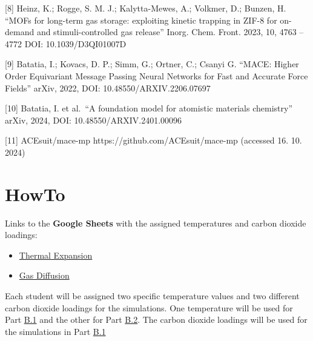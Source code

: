 \documentclass[
  letterpaper,
]{article}
\providecommand{\tightlist}{%
  \setlength{\itemsep}{0pt}\setlength{\parskip}{0pt}}\usepackage{longtable,booktabs,array}
\begin{document}
{[}8{]} Heinz, K.; Rogge, S. M. J.; Kalytta-Mewes, A.; Volkmer, D.;
Bunzen, H. ``MOFs for long-term gas storage: exploiting kinetic trapping
in ZIF-8 for on-demand and stimuli-controlled gas release'' Inorg. Chem.
Front. 2023, 10, 4763 -- 4772 DOI: 10.1039/D3QI01007D

{[}9{]} Batatia, I.; Kovacs, D. P.; Simm, G.; Ortner, C.; Csanyi G.
``MACE: Higher Order Equivariant Message Passing Neural Networks for
Fast and Accurate Force Fields'' arXiv, 2022, DOI:
10.48550/ARXIV.2206.07697

{[}10{]} Batatia, I. et al.~``A foundation model for atomistic materials
chemistry'' arXiv, 2024, DOI: 10.48550/ARXIV.2401.00096

{[}11{]} ACEsuit/mace-mp https://github.com/ACEsuit/mace-mp (accessed
16. 10. 2024)

\hypertarget{howto}{%
\section{HowTo}\label{howto}}

\begin{tcolorbox}[enhanced jigsaw, opacitybacktitle=0.6, colback=white, rightrule=.15mm, bottomrule=.15mm, coltitle=black, toprule=.15mm, bottomtitle=1mm, arc=.35mm, colframe=quarto-callout-warning-color-frame, opacityback=0, toptitle=1mm, breakable, titlerule=0mm, left=2mm, title=\textcolor{quarto-callout-warning-color}{\faExclamationTriangle}\hspace{0.5em}{Warning}, leftrule=.75mm, colbacktitle=quarto-callout-warning-color!10!white]

Links to the \textbf{Google Sheets} with the assigned temperatures and
carbon dioxide loadings:

\begin{itemize}
\tightlist
\item
  \href{https://docs.google.com/spreadsheets/d/1uy_fF13Oas9IhqCImCSvfEXV6vRb6oteAZK-Uj8DyMA/edit?usp=sharing}{Thermal
  Expansion}
\item
  \href{https://docs.google.com/spreadsheets/d/1zJnp6O_ToFMoJD91_3kiozHoKz9uGf1wEIlJoa3D_U8/edit?usp=sharing}{Gas
  Diffusion}
\end{itemize}

\end{tcolorbox}

Each student will be assigned two specific temperature values and two
different carbon dioxide loadings for the simulations. One temperature
will be used for Part
\protect\hyperlink{part-b.1-gas-simulation-in-zif-8}{B.1} and the other
for Part \protect\hyperlink{part-b.2-thermal-expansion-of-zif-8}{B.2}.
The carbon dioxide loadings will be used for the simulations in Part
\protect\hyperlink{part-b.1-gas-simulation-in-zif-8}{B.1}
\end{document}
